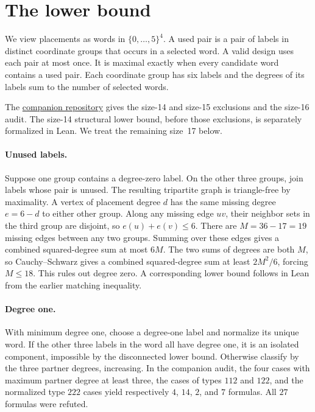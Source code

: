 \documentclass[11pt,letterpaper]{article}
\begin{document}
\section{The lower bound}
We view placements as words in $\{0,\ldots,5\}^4$. A used pair is a pair of
labels in distinct coordinate groups that occurs in a selected word. A
valid design uses each pair at most once. It is maximal exactly when every
candidate word contains a used pair. Each coordinate group has six labels
and the degrees of its labels sum to the number of selected words.

The \href{https://github.com/Aafimalek/novel-discoveries/tree/research/euler-order16/euler-36-officers-disconnected}{companion
repository} gives the size-14 and size-15 exclusions and the size-16 audit.
The size-14 structural lower bound, before those exclusions, is separately
formalized in Lean. We treat the remaining size~17 below.

\paragraph{Unused labels.}
Suppose one group contains a degree-zero label. On the other three groups,
join labels whose pair is unused. The resulting tripartite graph is
triangle-free by maximality. A vertex of placement degree $d$ has the
same missing degree $e=6-d$ to either other group. Along any missing edge
$uv$, their neighbor sets in the third group are disjoint, so
$e(u)+e(v)\le6$. There are $M=36-17=19$ missing edges between any two groups.
Summing over these edges gives a combined squared-degree sum at most
$6M$. The two sums of degrees are both $M$, so Cauchy--Schwarz gives a
combined squared-degree sum at least $2M^2/6$, forcing $M\le18$.
This rules out degree zero. A corresponding lower bound follows in Lean
from the earlier matching inequality.

\paragraph{Degree one.}
With minimum degree one, choose a degree-one label and normalize its
unique word. If the other three labels in the word all have degree one,
it is an isolated component, impossible by the disconnected lower bound.
Otherwise classify by the three partner degrees, increasing. In the
companion audit, the four cases with maximum partner degree at least
three, the cases of types $112$ and $122$, and the normalized type
$222$ cases yield respectively $4$, $14$, $2$, and $7$ formulas.
All $27$ formulas were refuted.
\end{document}
